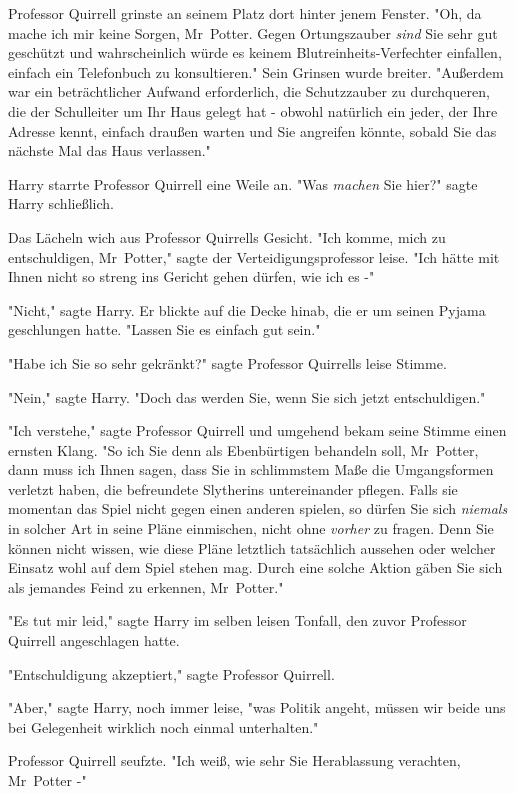 {Professor Quirrell grinste an seinem Platz dort hinter jenem Fenster. "Oh, da mache ich mir keine Sorgen, Mr~Potter. Gegen Ortungszauber \emph{sind} Sie sehr gut geschützt und wahrscheinlich würde es keinem Blutreinheits-Verfechter einfallen, einfach ein Telefonbuch zu konsultieren." Sein Grinsen wurde breiter. "Außerdem war ein beträchtlicher Aufwand erforderlich, die Schutzzauber zu durchqueren, die der Schulleiter um Ihr Haus gelegt hat - obwohl natürlich ein jeder, der Ihre Adresse kennt, einfach draußen warten und Sie angreifen könnte, sobald Sie das nächste Mal das Haus verlassen."

Harry starrte Professor Quirrell eine Weile an. "Was \emph{machen} Sie hier?" sagte Harry schließlich.

Das Lächeln wich aus Professor Quirrells Gesicht. "Ich komme, mich zu entschuldigen, Mr~Potter," sagte der Verteidigungsprofessor leise. "Ich hätte mit Ihnen nicht so streng ins Gericht gehen dürfen, wie ich es -"

"Nicht," sagte Harry. Er blickte auf die Decke hinab, die er um seinen Pyjama geschlungen hatte. "Lassen Sie es einfach gut sein."

"Habe ich Sie so sehr gekränkt?" sagte Professor Quirrells leise Stimme.

"Nein," sagte Harry. "Doch das werden Sie, wenn Sie sich jetzt entschuldigen."

"Ich verstehe," sagte Professor Quirrell und umgehend bekam seine Stimme einen ernsten Klang. "So ich Sie denn als Ebenbürtigen behandeln soll, Mr~Potter, dann muss ich Ihnen sagen, dass Sie in schlimmstem Maße die Umgangsformen verletzt haben, die befreundete Slytherins untereinander pflegen. Falls sie momentan das Spiel nicht gegen einen anderen spielen, so dürfen Sie sich \emph{niemals} in solcher Art in seine Pläne einmischen, nicht ohne \emph{vorher} zu fragen. Denn Sie können nicht wissen, wie diese Pläne letztlich tatsächlich aussehen oder welcher Einsatz wohl auf dem Spiel stehen mag. Durch eine solche Aktion gäben Sie sich als jemandes Feind zu erkennen, Mr~Potter."

"Es tut mir leid," sagte Harry im selben leisen Tonfall, den zuvor Professor Quirrell angeschlagen hatte.

"Entschuldigung akzeptiert," sagte Professor Quirrell.

"Aber," sagte Harry, noch immer leise, "was Politik angeht, müssen wir beide uns bei Gelegenheit wirklich noch einmal unterhalten."

Professor Quirrell seufzte. "Ich weiß, wie sehr Sie Herablassung verachten, Mr~Potter -"

}
